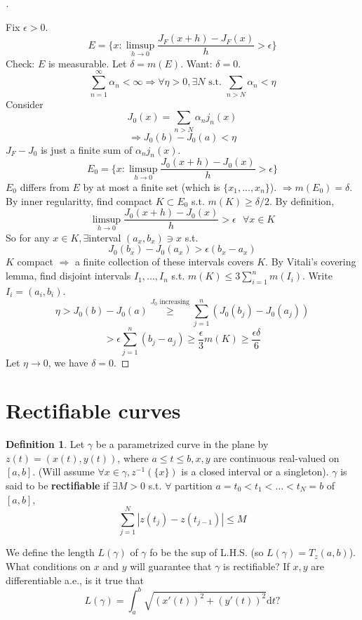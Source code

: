 \documentclass{article}
\newcommand{\sfa}{\text{  } \forall}
\theoremstyle{definition}
\newtheorem{dfn}{Definition}
\newenvironment{proofs}[1][\proofname]{%
  \begin{proof}[#1]$ $\par\nobreak\ignorespaces
}{%
  \end{proof}
}
\begin{document}
\begin{proofs}
  Fix $\epsilon > 0$. 
  \[
    E = \{x: \limsup_{h \to 0} \frac{J_F(x + h) - J_F(x)}{h} > \epsilon\}
  \]
  Check: $E$ is measurable. Let $\delta = m(E)$. Want: $\delta = 0$.
  \[
    \sum_{n = 1}^\infty \alpha_n < \infty \Rightarrow \forall \eta > 0, \exists N \text{ s.t. } \sum_{n > N} \alpha_n < \eta
  \]
  Consider
  \[
    J_0(x) = \sum_{n > N} \alpha_nj_n(x)
  \]
  \[
    \Rightarrow J_0(b) - J_0(a) < \eta
  \]
  $J_F - J_0$ is just a finite sum of $\alpha_n j_n(x)$.
  \[
    E_0 = \{x: \limsup_{h \to 0} \frac{J_0(x + h) - J_0(x)}{h} > \epsilon\}
  \]
  $E_0$ differs from $E$ by at most a finite set (which is $\{x_1, ..., x_n\}$). $\Rightarrow m(E_0) = \delta$. By inner regularitty, find compact $K \subset E_0$ s.t. $m(K) \geq \delta/2$. By definition, 
  \[
    \limsup_{h \to 0} \frac{J_0(x + h) - J_0(x)}{h} > \epsilon \sfa x \in K
  \]
  So for any $x \in K, \exists $interval $(a_x, b_x) \ni x$ s.t.
  \[
    J_0(b_x) - J_0(a_x) > \epsilon(b_x - a_x)
  \]
  $K$ compact $\Rightarrow $ a finite collection of these intervals covers $K$. By Vitali's covering lemma, find disjoint intervals $I_1, ..., I_n$ s.t. $m(K) \leq 3 \sum_{i = 1}^n m(I_i)$. Write $I_i = (a_i, b_i)$. 
  \[
    \eta > J_0(b) - J_0(a) \stackrel{J_0 \text{ increasing}}{\geq} \sum_{j = 1}^n (J_0(b_j) - J_0(a_j)) 
  \]
  \[
    > \epsilon \sum_{j = 1}^n (b_j - a_j) \geq \frac{\epsilon}{3} m(K) \geq \frac{\epsilon \delta}{6}
  \]
  Let $\eta \to 0$, we have $\delta = 0$. 
\end{proofs}

\section{Rectifiable curves}

\begin{dfn}
	Let $\gamma$ be a parametrized curve in the plane by $z(t) = (x(t), y(t))$, where $a \leq t \leq b, x, y$ are continuous real-valued on $[a, b]$. (Will assume $\forall x \in \gamma, z^{-1}(\{x\})$ is a closed interval or a singleton). $\gamma$ is said to be \textbf{rectifiable} if $\exists M > 0$ s.t. $\forall$ partition $a = t_0 < t_1 < \hdots < t_N = b$ of $[a, b]$, 
  \[
    \sum_{j = 1}^N |z(t_j) - z(t_{j - 1})| \leq M
  \]
\end{dfn}
We define the length $L(\gamma)$ of $\gamma$ fo be the sup of L.H.S. (so $L(\gamma) = T_z(a, b)$). What conditions on $x$ and $y$ will guarantee that $\gamma$ is rectifiable? If $x, y$ are differentiable a.e., is it true that
\[
  L(\gamma) = \int_a^b \sqrt{(x'(t))^2 + (y'(t))^2} \mathrm{d} t \text{?}
\]
\end{document}
